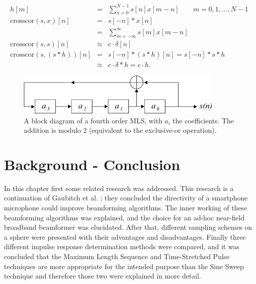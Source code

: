 \begin{eqnarray}
\label{eq:circ_conv}
h[m]&=&\sum\limits_{n=0}^{N-1}s[n]x[m-n]\qquad m=0,1,\ldots,N-1\\
\label{eq:crosscor}
\text{crosscor}(s,x)[n]&=&s[-n]*x[n]\\
&=&\sum\limits_{m=-\infty}^\infty s[m]x[m-n] \nonumber \\
\label{eq:todelta}
\text{crosscor}(s,s)[n]&\approx&c\cdot\delta[n]\\
\label{eq:tada_ir}
\text{crosscor}(s,(s*h))[n]&=&s[-n]*(s*h)[n]=s[-n]*s*h\\
&\approx& c\cdot\delta*h=c\cdot h \nonumber.
\end{eqnarray}

\begin{figure}[h]
    \centering
    \includegraphics[width=10cm]{afbeeldingen/Directivity_MLS.png}
    \caption[MLS feedback shift-register]{A block diagram of a fourth order MLS, with $a_i$ the coefficients. The addition is modulo 2 (equivalent to the exclusive-or operation).}
    \label{fig:register}
\end{figure}

\section*{Background - Conclusion}
In this chapter first some related research was addressed.
This research is a continuation of Gaubitch et al. \cite{Gaubitch2014}; they concluded the directivity of a smartphone microphone could improve beamforming algorithms.
The inner working of these beamforming algorithms was explained, and the choice for an ad-hoc near-field broadband beamformer was elucidated.
After that, different sampling schemes on a sphere were presented with their advantages and disadvantages.
Finally three different impulse response determination methods were compared, and it was concluded that the Maximum Length Sequence and Time-Stretched Pulse techniques are more appropriate for the intended purpose than the Sine Sweep technique and therefore those two were explained in more detail.
